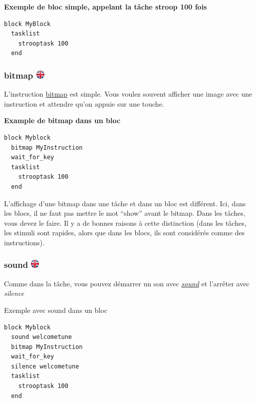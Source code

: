 \documentclass[
]{book}
\begin{document}
\textbf{Exemple de bloc simple, appelant la tâche stroop 100 fois}

\begin{verbatim}
block MyBlock
  tasklist
    strooptask 100
  end
\end{verbatim}

\hypertarget{bitmap}{%
\subsubsection[bitmap ]{\texorpdfstring{bitmap \href{https://www.psytoolkit.org/doc3.2.0/syntax.html\#block-bitmap}{\protect\includegraphics{img/ukflag.png}}}{bitmap }}\label{bitmap}}

L'instruction \protect\hyperlink{bitmap}{bitmap} est simple. Vous voulez souvent afficher une image avec une instruction et attendre qu'on appuie sur une touche.

\textbf{Example de bitmap dans un bloc}

\begin{verbatim}
block Myblock
  bitmap MyInstruction
  wait_for_key
  tasklist
    strooptask 100
  end
\end{verbatim}

L'affichage d'une bitmap dans une tâche et dans un bloc est différent. Ici, dans les blocs, il ne faut pas mettre le mot ``show'' avant le bitmap. Dans les tâches, vous devez le faire. Il y a de bonnes raisons à cette distinction (dans les tâches, les stimuli sont rapides, alors que dans les blocs, ils sont considérés comme des instructions).

\hypertarget{sound-1}{%
\subsubsection[sound ]{\texorpdfstring{sound \href{https://www.psytoolkit.org/doc3.2.0/syntax.html\#block-sound}{\protect\includegraphics{img/ukflag.png}}}{sound }}\label{sound-1}}

Comme dans la tâche, vous pouvez démarrer un son avec \emph{\protect\hyperlink{sound}{sound}} et l'arrêter avec \emph{silence}

Exemple avec sound dans un bloc

\begin{verbatim}
block Myblock
  sound welcometune
  bitmap MyInstruction
  wait_for_key
  silence welcometune
  tasklist
    strooptask 100
  end
\end{verbatim}
\end{document}
